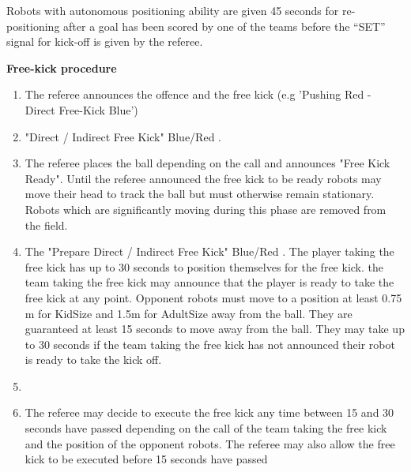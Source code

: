 Robots with autonomous positioning ability are given  45 seconds
for re-positioning after a goal has been scored by one of the teams before the
``SET'' signal for kick-off is given by the referee. 

\bigskip


{\bfseries Free-kick procedure}

\begin{enumerate}
\item The referee  announces the offence and the free kick
      (e.g 'Pushing Red - Direct Free-Kick Blue')
\item {}  "Direct / Indirect Free Kick" Blue/Red .
\item The referee places the ball depending on the call and announces "Free Kick Ready".
      Until the referee announced the free kick to be ready robots may move
      their head to track the ball but must otherwise remain stationary.
      Robots which are significantly moving during this phase are removed from the field.
\item The  
      "Prepare Direct / Indirect Free Kick" Blue/Red .
      The player taking the free kick has up to 30 seconds to position
      themselves for the free kick.
       the team taking the free kick may announce that the player is ready to
      take the free kick at any point.
      Opponent robots must move to a position at least 0.75 m for KidSize and
      1.5m for AdultSize away from the ball.
      They are guaranteed at least 15 seconds to move away from the ball.
      They may take up to 30 seconds if the team taking the free kick has not
      announced their robot is ready to take the kick off.
\item {}
\item The referee may decide to execute the free kick any time between 15 and 30 seconds
      have passed depending on the call of the team taking the free kick and the position of
      the opponent robots.
      The referee may also allow the free kick to be executed before 15 seconds have passed

\end{enumerate}

